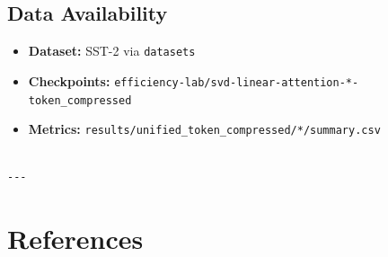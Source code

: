 \subsection{Data Availability}

\begin{itemize}
\item \textbf{Dataset:} SST-2 via \texttt{datasets}
\item \textbf{Checkpoints:} \texttt{efficiency-lab/svd-linear-attention-*-token\_compressed}
\item \textbf{Metrics:} \texttt{results/unified\_token\_compressed/*/summary.csv}
\end{itemize}
\begin{lstlisting}

---
\end{lstlisting}

\section{References}


